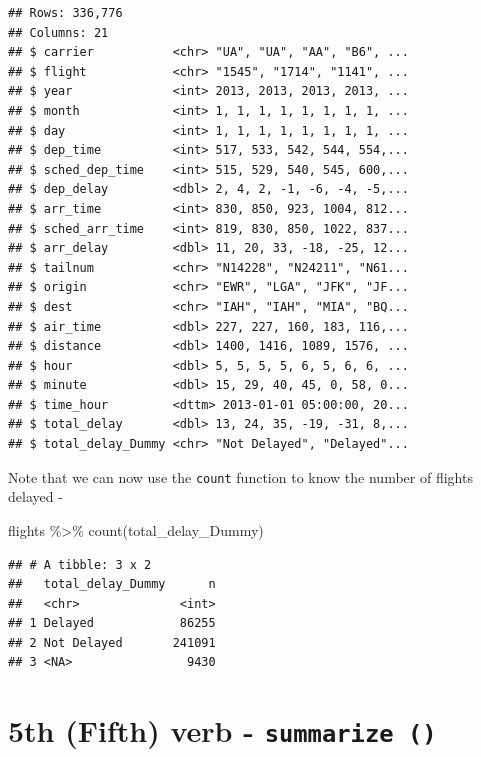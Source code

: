 \documentclass[
]{book}
\newenvironment{Shaded}{\begin{snugshade}}{\end{snugshade}}
\newcommand{\FunctionTok}[1]{\textcolor[rgb]{0.00,0.00,0.00}{#1}}
\newcommand{\NormalTok}[1]{#1}
\newcommand{\SpecialCharTok}[1]{\textcolor[rgb]{0.00,0.00,0.00}{#1}}
\begin{document}
\begin{verbatim}
## Rows: 336,776
## Columns: 21
## $ carrier           <chr> "UA", "UA", "AA", "B6", ...
## $ flight            <chr> "1545", "1714", "1141", ...
## $ year              <int> 2013, 2013, 2013, 2013, ...
## $ month             <int> 1, 1, 1, 1, 1, 1, 1, 1, ...
## $ day               <int> 1, 1, 1, 1, 1, 1, 1, 1, ...
## $ dep_time          <int> 517, 533, 542, 544, 554,...
## $ sched_dep_time    <int> 515, 529, 540, 545, 600,...
## $ dep_delay         <dbl> 2, 4, 2, -1, -6, -4, -5,...
## $ arr_time          <int> 830, 850, 923, 1004, 812...
## $ sched_arr_time    <int> 819, 830, 850, 1022, 837...
## $ arr_delay         <dbl> 11, 20, 33, -18, -25, 12...
## $ tailnum           <chr> "N14228", "N24211", "N61...
## $ origin            <chr> "EWR", "LGA", "JFK", "JF...
## $ dest              <chr> "IAH", "IAH", "MIA", "BQ...
## $ air_time          <dbl> 227, 227, 160, 183, 116,...
## $ distance          <dbl> 1400, 1416, 1089, 1576, ...
## $ hour              <dbl> 5, 5, 5, 5, 6, 5, 6, 6, ...
## $ minute            <dbl> 15, 29, 40, 45, 0, 58, 0...
## $ time_hour         <dttm> 2013-01-01 05:00:00, 20...
## $ total_delay       <dbl> 13, 24, 35, -19, -31, 8,...
## $ total_delay_Dummy <chr> "Not Delayed", "Delayed"...
\end{verbatim}

Note that we can now use the \texttt{count} function to know the number of flights delayed -

\begin{Shaded}
\begin{Highlighting}[]
\NormalTok{flights }\SpecialCharTok{\%\textgreater{}\%} 
  \FunctionTok{count}\NormalTok{(total\_delay\_Dummy)}
\end{Highlighting}
\end{Shaded}

\begin{verbatim}
## # A tibble: 3 x 2
##   total_delay_Dummy      n
##   <chr>              <int>
## 1 Delayed            86255
## 2 Not Delayed       241091
## 3 <NA>                9430
\end{verbatim}

\hypertarget{th-fifth-verb---summarize}{%
\section{\texorpdfstring{5th (Fifth) verb - \texttt{summarize\ ()}}{5th (Fifth) verb - summarize ()}}\label{th-fifth-verb---summarize}}
\end{document}
